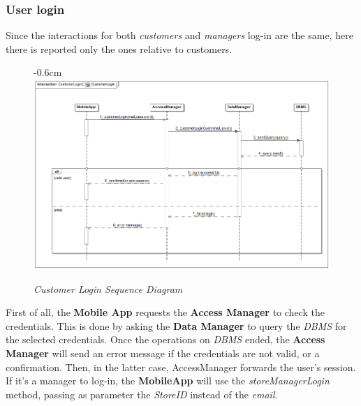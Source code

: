 \documentclass{article}
\begin{document}
	\subsubsection{User login}
	 Since the interactions for both \emph{customers} and \emph{managers} log-in are the same, here there is reported only the ones relative to customers.
	
	\begin{figure}[H]
		\begin{adjustwidth} {-0.6cm}{}
			\centering
			\includegraphics[scale=0.4]{Sequence Diagrams/sd__CustomerLogin__CustomerLogin.png}
		\end{adjustwidth}
		\caption{\emph{Customer Login Sequence Diagram}}
	\end{figure}

	First of all, the {\bfseries Mobile App} requests the {\bfseries Access Manager} to check the credentials. This is done by asking the {\bfseries Data Manager} to query the \emph{DBMS} for the selected credentials. Once the operations on \emph{DBMS} ended, the {\bfseries Access Manager} will send an error message if the credentials are not valid, or a confirmation. Then, in the latter case, AccessManager forwards the user's session. If it's a manager to log-in, the {\bfseries MobileApp} will use the \emph{storeManagerLogin} method, passing as parameter the \emph{StoreID} instead of the \emph{email}.
	
\end{document}
